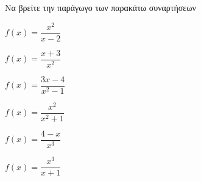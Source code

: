 Να βρείτε την παράγωγο των παρακάτω συναρτήσεων
\begin{multicols}{2}
\begin{alist}
\item $ f(x)=\dfrac{x^2}{x-2} $
\item $ f(x)=\dfrac{x+3}{x^2} $
\item $ f(x)=\dfrac{3x-4}{x^2-1} $
\item $ f(x)=\dfrac{x^2}{x^2+1} $
\item $ f(x)=\dfrac{4-x}{x^3} $
\item $ f(x)=\dfrac{x^3}{x+1} $
\end{alist}
\end{multicols}
